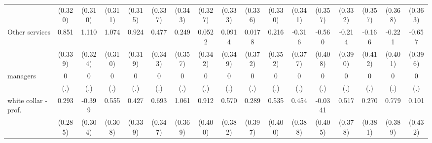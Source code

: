 {\begin{tabular}{l*{16}{c}}
                    &     (0.320)         &     (0.310)         &     (0.311)         &     (0.315)         &     (0.337)         &     (0.343)         &     (0.327)         &     (0.333)         &     (0.336)         &     (0.330)         &     (0.341)         &     (0.357)         &     (0.332)         &     (0.357)         &     (0.368)         &     (0.363)         \\
[1em]
Other services      &       0.851\sym{*}  &       1.110\sym{***}&       1.074\sym{***}&       0.924\sym{**} &       0.477         &       0.249         &      0.0522         &      0.0914         &      0.0178         &       0.216         &      -0.316         &      -0.560         &      -0.214         &      -0.166         &      -0.221         &      -0.657         \\
                    &     (0.339)         &     (0.324)         &     (0.310)         &     (0.319)         &     (0.343)         &     (0.357)         &     (0.342)         &     (0.349)         &     (0.372)         &     (0.352)         &     (0.377)         &     (0.408)         &     (0.390)         &     (0.412)         &     (0.401)         &     (0.396)         \\
[1em]
managers            &           0         &           0         &           0         &           0         &           0         &           0         &           0         &           0         &           0         &           0         &           0         &           0         &           0         &           0         &           0         &           0         \\
                    &         (.)         &         (.)         &         (.)         &         (.)         &         (.)         &         (.)         &         (.)         &         (.)         &         (.)         &         (.)         &         (.)         &         (.)         &         (.)         &         (.)         &         (.)         &         (.)         \\
[1em]
white collar - prof.&       0.293         &      -0.399         &       0.555         &       0.427         &       0.693\sym{*}  &       1.061\sym{**} &       0.912\sym{*}  &       0.570         &       0.289         &       0.535         &       0.454         &     -0.0341         &       0.517         &       0.270         &       0.779\sym{*}  &       0.101         \\
                    &     (0.285)         &     (0.304)         &     (0.308)         &     (0.339)         &     (0.347)         &     (0.369)         &     (0.400)         &     (0.382)         &     (0.397)         &     (0.400)         &     (0.388)         &     (0.405)         &     (0.378)         &     (0.381)         &     (0.389)         &     (0.432)         \\

\end{tabular}}
